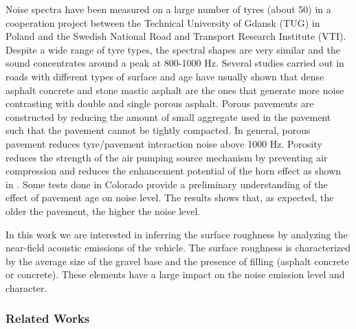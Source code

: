 Noise spectra have been measured on a large number of tyres (about 50) \cite{sandberg2003multi} in a cooperation project between the Technical University of Gdansk (TUG) in Poland and the Swedish National Road and Transport Research Institute (VTI). Despite a wide range of tyre types, the spectral shapes are very similar and the sound concentrates around a peak at 800-1000 Hz. 
Several studies \cite{freitas2009traffic} carried out in roads with different types of surface and age have usually shown that dense asphalt concrete and stone mastic asphalt are the ones that generate more noise contrasting with double and single porous asphalt. Porous pavements are constructed by reducing the amount of small aggregate used in the pavement
such that the pavement cannot be tightly compacted. In general, porous pavement reduces tyre/pavement interaction noise above 1000 Hz. Porosity reduces the strength of the air pumping source mechanism by preventing air compression and reduces the enhancement potential of the horn effect as shown in . 
Some tests \cite{hanson2004tire} done in Colorado provide a preliminary understanding of the effect of pavement age on noise level. The results shows that, as expected, the older the pavement, the higher the noise level.

In this work we are interested in inferring the surface roughness by analyzing the near-field acoustic emissions of the vehicle. The surface roughness is characterized by the average size of the gravel base and the presence of filling (asphalt concrete or concrete). These elements have a large impact on the noise emission level and character. 


\subsubsection{Related Works}


